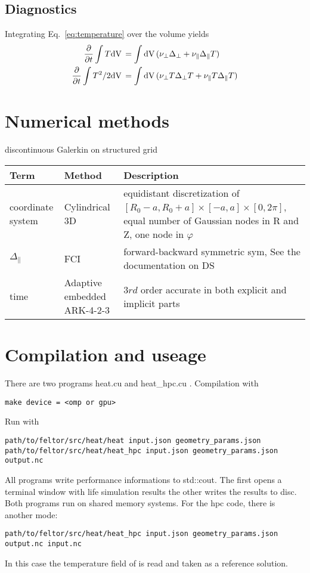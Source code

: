 \subsection{Diagnostics}
Integrating Eq.~\eqref{eq:temperature} over the volume yields
\begin{align}
 \frac{\partial}{\partial t} \int T \mathrm{dV}\, &=
    \int \mathrm{dV}\, ( \nu_\perp \Delta_\perp + \nu_\parallel \Delta_\parallel T) \\
 \frac{\partial}{\partial t} \int T^2/2 \mathrm{dV}\, &=
    \int \mathrm{dV}\, ( \nu_\perp T\Delta_\perp T + \nu_\parallel T\Delta_\parallel T)
\label{}
\end{align}
\section{Numerical methods}
discontinuous Galerkin on structured grid
\begin{longtable}{ll>{\RaggedRight}p{7cm}}
\toprule
\rowcolor{gray!50}\textbf{Term} &  \textbf{Method} & \textbf{Description}  \\ \midrule
coordinate system & Cylindrical 3D & equidistant discretization of $[R_0-a,R_0+a] \times [-a,a] \times [0,2\pi]$, equal number of Gaussian nodes in R and Z, one node in $\varphi$ \\
$\Delta_\parallel$ & FCI & forward-backward symmetric sym, See the documentation on DS\\
time &  Adaptive embedded ARK-4-2-3 & $3rd$ order accurate in both
explicit and implicit parts\\
\bottomrule
\end{longtable}

\section{Compilation and useage}
There are two programs heat.cu and heat\_hpc.cu . Compilation with
\begin{verbatim}
make device = <omp or gpu>
\end{verbatim}
Run with
\begin{verbatim}
path/to/feltor/src/heat/heat input.json geometry_params.json
path/to/feltor/src/heat/heat_hpc input.json geometry_params.json output.nc
\end{verbatim}
All programs write performance informations to std::cout.
The first opens a terminal window with life simulation results
the
other writes the results to disc. Both programs run on shared memory
systems.
For the hpc code, there is another mode:
\begin{verbatim}
path/to/feltor/src/heat/heat_hpc input.json geometry_params.json output.nc input.nc
\end{verbatim}
In this case the temperature field of  is read
and taken as a reference solution.


